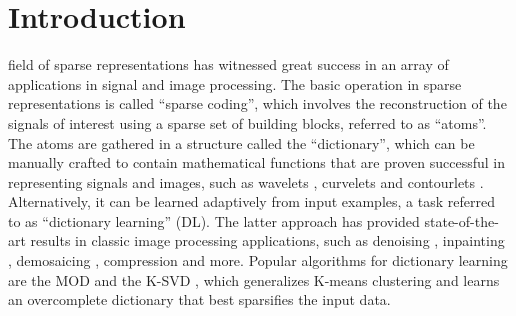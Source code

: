 \documentclass[journal]{IEEEtran}
\begin{document}
%
\IEEEpeerreviewmaketitle



\section{Introduction}

 field of sparse representations has witnessed great success in an array of applications in signal and image processing.
The basic operation in sparse representations is called ``sparse coding'', which involves the reconstruction of the signals of interest using a sparse set of building blocks, referred to as ``atoms''. The atoms are gathered in a structure called the ``dictionary'', which can be manually crafted to contain mathematical functions that are proven successful in representing signals and images, such as wavelets \cite{WaveletDic}, curvelets \cite{CurveletDic} and contourlets \cite{ContourletDic}. Alternatively, it can be learned adaptively from input examples, a task referred to as ``dictionary learning'' (DL). The latter approach has provided state-of-the-art results in classic image processing applications, such as denoising \cite{KSVDDenoising}, inpainting \cite{KSVDInpainting}, demosaicing \cite{SparseApplications}, compression \cite{KSVDCompression,KSVDCompression2} and more.
Popular algorithms for dictionary learning are the MOD \cite{MOD} and the K-SVD \cite{KSVD}, which generalizes K-means clustering and learns an overcomplete dictionary that best sparsifies the input data.
\end{document}
